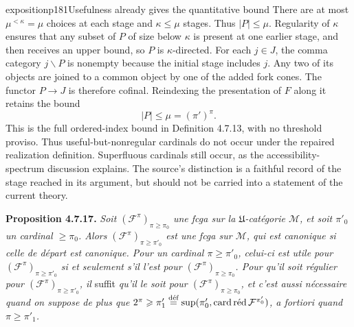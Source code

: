 \begin{dcomment}{exposition}{p181}{Usefulness already gives the quantitative bound}
There are at most $\mu^{<\kappa}=\mu$ choices at each stage and $\kappa\leq\mu$ stages. Thus $|P|\leq\mu$. Regularity of $\kappa$ ensures that any subset of $P$ of size below $\kappa$ is present at one earlier stage, and then receives an upper bound, so $P$ is $\kappa$-directed. For each $j\in J$, the comma category $j\backslash P$ is nonempty because the initial stage includes $j$. Any two of its objects are joined to a common object by one of the added fork cones. The functor $P\to J$ is therefore cofinal. Reindexing the presentation of $F$ along it retains the bound
\[
 |P|\leq\mu=(\pi')^\pi.
\]
This is the full ordered-index bound in Definition 4.7.13, with no threshold proviso. Thus useful-but-nonregular cardinals do not occur under the repaired realization definition. Superfluous cardinals still occur, as the accessibility-spectrum discussion explains. The source's distinction is a faithful record of the stage reached in its argument, but should not be carried into a statement of the current theory.
\end{dcomment}


\textbf{Proposition 4.7.17.} \textit{Soit $(\mathcal{F}^{\pi})_{\pi\geqslant\pi_0}$ une fcga sur la $\mathfrak{U}$-catégorie $\mathcal{M}$, et soit $\pi'_0$ un cardinal $\geqslant\pi_0$. Alors $(\mathcal{F}^{\pi})_{\pi\geqslant\pi'_0}$ est une fcga sur $\mathcal{M}$, qui est canonique si celle de départ est canonique. Pour un cardinal $\pi\geqslant\pi'_0$, celui-ci est utile pour $(\mathcal{F}^{\pi})_{\pi\geqslant\pi'_0}$ si et seulement s'il l'est pour $(\mathcal{F}^{\pi})_{\pi\geqslant\pi_0}$. Pour qu'il soit régulier pour $(\mathcal{F}^{\pi})_{\pi\geqslant\pi'_0}$, il} suffit \textit{qu'il le soit pour $(\mathcal{F}^{\pi})_{\pi\geqslant\pi_0}$, et c'est aussi nécessaire quand on suppose de plus que $2^{\pi}\geqslant\pi'_1\overset{\text{déf}}{=}\sup(\pi'_0,\mathop{\mathrm{card}\,\textup{réd}}\nolimits\mathcal{F}^{\pi'_0})$, a fortiori quand $\pi\geqslant\pi'_1$.}

